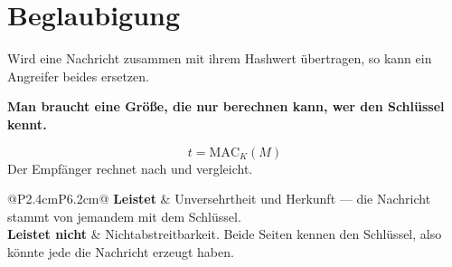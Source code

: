 \section{Beglaubigung}

\begin{merksatz}
Wird eine Nachricht zusammen mit ihrem Hashwert übertragen, so kann ein Angreifer beides ersetzen.

\begin{center}
\begin{minipage}{0.9\textwidth}
\textbf{Man braucht eine Größe, die nur berechnen kann, wer den Schlüssel kennt.}
\end{minipage}
\end{center}

\[ t = \mathrm{MAC}_K(M) \]
Der Empfänger rechnet nach und vergleicht.

\begin{center}
{\small
\renewcommand{\arraystretch}{1.5}
\begin{tabular}{@{}P{2.4cm}P{6.2cm}@{}}
\toprule
\textbf{Leistet} & Unversehrtheit und Herkunft --- die Nachricht stammt von jemandem mit dem Schlüssel.\\
\textbf{Leistet nicht} & Nichtabstreitbarkeit. Beide Seiten kennen den Schlüssel, also könnte jede die Nachricht erzeugt haben.\\
\bottomrule
\end{tabular}}
\end{center}

\begin{center}
\begin{minipage}{0.88\textwidth}
\end{minipage}
\end{center}
\end{merksatz}

